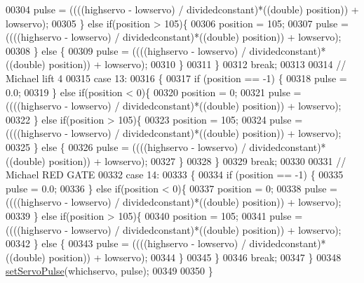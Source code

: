 \begin{DoxyCode}
00304                 pulse = ((((highservo - lowservo) / dividedconstant)*((double) position)) + lowservo);
00305             \} \textcolor{keywordflow}{else} \textcolor{keywordflow}{if}(position > 105)\{
00306                 position = 105;
00307                 pulse = ((((highservo - lowservo) / dividedconstant)*((double) position)) + lowservo);
00308             \} \textcolor{keywordflow}{else} \{
00309                 pulse = ((((highservo - lowservo) / dividedconstant)*((double) position)) + lowservo);
00310             \}
00311         \}
00312             \textcolor{keywordflow}{break};
00313 
00314             \textcolor{comment}{// Michael lift 4}
00315         \textcolor{keywordflow}{case} 13:
00316         \{
00317             \textcolor{keywordflow}{if} (position == -1) \{
00318                 pulse = 0.0;
00319             \} \textcolor{keywordflow}{else} \textcolor{keywordflow}{if}(position < 0)\{
00320                 position = 0;
00321                 pulse = ((((highservo - lowservo) / dividedconstant)*((double) position)) + lowservo);
00322             \} \textcolor{keywordflow}{else} \textcolor{keywordflow}{if}(position > 105)\{
00323                 position = 105;
00324                 pulse = ((((highservo - lowservo) / dividedconstant)*((double) position)) + lowservo);
00325             \} \textcolor{keywordflow}{else} \{
00326                 pulse = ((((highservo - lowservo) / dividedconstant)*((double) position)) + lowservo);
00327             \}
00328         \}
00329             \textcolor{keywordflow}{break};
00330 
00331             \textcolor{comment}{// Michael RED GATE}
00332         \textcolor{keywordflow}{case} 14:
00333         \{
00334             \textcolor{keywordflow}{if} (position == -1) \{
00335                 pulse = 0.0;
00336             \} \textcolor{keywordflow}{else} \textcolor{keywordflow}{if}(position < 0)\{
00337                 position = 0;
00338                 pulse = ((((highservo - lowservo) / dividedconstant)*((double) position)) + lowservo);
00339             \} \textcolor{keywordflow}{else} \textcolor{keywordflow}{if}(position > 105)\{
00340                 position = 105;
00341                 pulse = ((((highservo - lowservo) / dividedconstant)*((double) position)) + lowservo);
00342             \} \textcolor{keywordflow}{else} \{
00343                 pulse = ((((highservo - lowservo) / dividedconstant)*((double) position)) + lowservo);
00344             \}
00345         \}
00346             \textcolor{keywordflow}{break};
00347     \}
00348     \hyperlink{Servo__Position__Shell_8cpp_a7f07c548295f3696f8881f0c9de708b1}{setServoPulse}(whichservo, pulse);
00349 
00350 \}
\end{DoxyCode}
